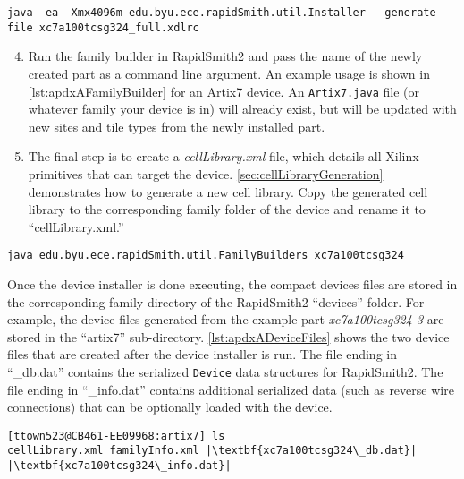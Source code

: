 \begin{lstlisting}[numbers=none, caption=RapidSmith2 device installer example
usage, label=lst:apdxAInstaller] 
java -ea -Xmx4096m edu.byu.ece.rapidSmith.util.Installer --generate file xc7a100tcsg324_full.xdlrc
\end{lstlisting}

\begin{enumerate}
\setcounter{enumi}{3}
\item Run the family builder in RapidSmith2 and pass the name of the newly
created part as a command line argument. An example usage is shown in
\autoref{lst:apdxAFamilyBuilder} for an Artix7 device. An \texttt{Artix7.java}
file (or whatever family your device is in) will already exist, but will be
updated with new sites and tile types from the newly installed part.

\item The final step is to create a \textit{cellLibrary.xml} file, which details
all Xilinx primitives that can target the device. \autoref{sec:cellLibraryGeneration}
demonstrates how to generate a new cell library. Copy the generated cell library
to the corresponding family folder of the device and rename it to
``cellLibrary.xml.''

\end{enumerate}

\begin{lstlisting}[numbers=none, caption=Family builder example usage,
label=lst:apdxAFamilyBuilder] 
java edu.byu.ece.rapidSmith.util.FamilyBuilders xc7a100tcsg324
\end{lstlisting}

\vspace{.3cm}

\noindent Once the device installer is done executing, the compact devices files
are stored in the corresponding family directory of the RapidSmith2 ``devices''
folder. For example, the device files generated from the example part
\textit{xc7a100tcsg324-3} are stored in the ``artix7'' sub-directory.
\autoref{lst:apdxADeviceFiles} shows the two device files that are created
after the device installer is run. The file ending in ``\_db.dat'' contains the
serialized \texttt{Device} data structures for RapidSmith2. The file ending in
``\_info.dat'' contains additional serialized data (such as reverse wire
connections) that can be optionally loaded with the device.

\begin{lstlisting}[numbers=none, caption=Generated RapidSmith2 device files,
label=lst:apdxADeviceFiles] 
[ttown523@CB461-EE09968:artix7] ls
cellLibrary.xml familyInfo.xml |\textbf{xc7a100tcsg324\_db.dat}| |\textbf{xc7a100tcsg324\_info.dat}|
\end{lstlisting} 

